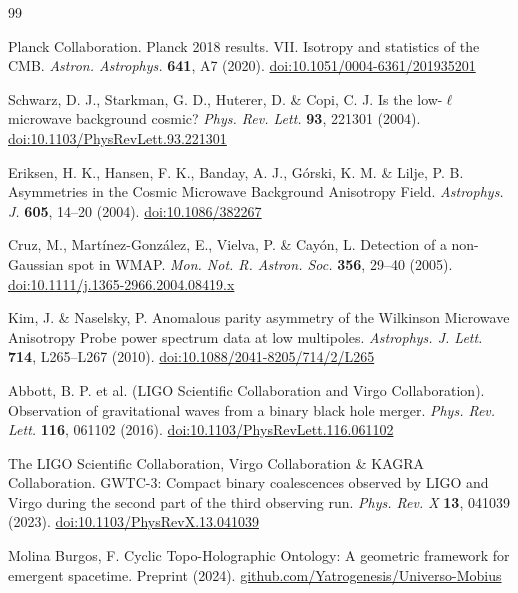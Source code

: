 \documentclass[11pt,a4paper]{article}
\begin{document}

\begin{thebibliography}{99}

 Planck Collaboration. Planck 2018 results. VII. Isotropy and statistics of the CMB. \textit{Astron. Astrophys.} \textbf{641}, A7 (2020). \href{https://doi.org/10.1051/0004-6361/201935201}{doi:10.1051/0004-6361/201935201}

 Schwarz, D. J., Starkman, G. D., Huterer, D. \& Copi, C. J. Is the low-$\ell$ microwave background cosmic? \textit{Phys. Rev. Lett.} \textbf{93}, 221301 (2004). \href{https://doi.org/10.1103/PhysRevLett.93.221301}{doi:10.1103/PhysRevLett.93.221301}

 Eriksen, H. K., Hansen, F. K., Banday, A. J., G{\'o}rski, K. M. \& Lilje, P. B. Asymmetries in the Cosmic Microwave Background Anisotropy Field. \textit{Astrophys. J.} \textbf{605}, 14--20 (2004). \href{https://doi.org/10.1086/382267}{doi:10.1086/382267}

 Cruz, M., Mart{\'i}nez-Gonz{\'a}lez, E., Vielva, P. \& Cay{\'o}n, L. Detection of a non-Gaussian spot in WMAP. \textit{Mon. Not. R. Astron. Soc.} \textbf{356}, 29--40 (2005). \href{https://doi.org/10.1111/j.1365-2966.2004.08419.x}{doi:10.1111/j.1365-2966.2004.08419.x}

 Kim, J. \& Naselsky, P. Anomalous parity asymmetry of the Wilkinson Microwave Anisotropy Probe power spectrum data at low multipoles. \textit{Astrophys. J. Lett.} \textbf{714}, L265--L267 (2010). \href{https://doi.org/10.1088/2041-8205/714/2/L265}{doi:10.1088/2041-8205/714/2/L265}

 Abbott, B. P. et al. (LIGO Scientific Collaboration and Virgo Collaboration). Observation of gravitational waves from a binary black hole merger. \textit{Phys. Rev. Lett.} \textbf{116}, 061102 (2016). \href{https://doi.org/10.1103/PhysRevLett.116.061102}{doi:10.1103/PhysRevLett.116.061102}

 The LIGO Scientific Collaboration, Virgo Collaboration \& KAGRA Collaboration. GWTC-3: Compact binary coalescences observed by LIGO and Virgo during the second part of the third observing run. \textit{Phys. Rev. X} \textbf{13}, 041039 (2023). \href{https://doi.org/10.1103/PhysRevX.13.041039}{doi:10.1103/PhysRevX.13.041039}

 Molina Burgos, F. Cyclic Topo-Holographic Ontology: A geometric framework for emergent spacetime. Preprint (2024). \href{https://github.com/Yatrogenesis/Universo-Mobius}{github.com/Yatrogenesis/Universo-Mobius}


\end{thebibliography}
\end{document}
